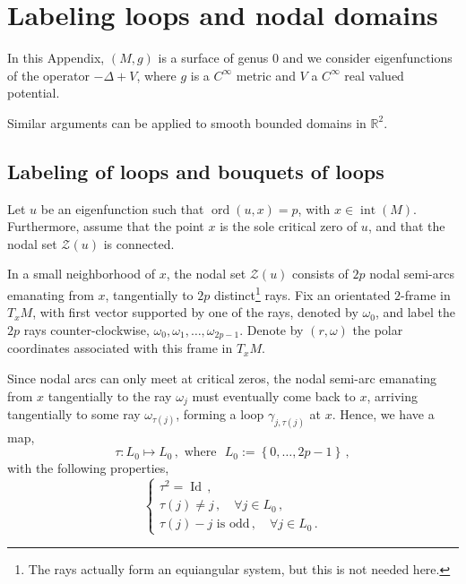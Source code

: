 \documentclass[12pt,a4paper]{amsart}
\theoremstyle{plain} %
\theoremstyle{definition}
\numberwithin{equation}{section}
\numberwithin{figure}{section}
\numberwithin{table}{section}
\newcommand{\R}{\mathbb{R}}
\newcommand{\cZ}{\mathcal{Z}}
\DeclareMathOperator{\inte}{int}
\DeclareMathOperator{\id}{Id}
\DeclareMathOperator{\ord}{ord}
\newcommand{\set}[1]{\left\lbrace #1 \right\rbrace}
\begin{document}
\section{Labeling loops and nodal domains}\label{S-llnd}

In this Appendix, $(M,g)$ is a surface of genus $0$ and we consider eigenfunctions of the operator $-\Delta + V$, where $g$ is a $C^{\infty}$ metric and $V$ a $C^{\infty}$ real valued potential.

 Similar arguments can be applied to smooth bounded domains in $\R^2$.


\subsection{Labeling of loops and bouquets of loops}\label{SS-llnd-w}

Let $u$ be an eigenfunction such that $\ord(u,x) =p$, with $x \in \inte(M)$. Furthermore, assume that the point $x$  is the sole critical zero of $u$, and that the nodal set $\cZ(u)$ is connected. \smallskip

In a small neighborhood of $x$, the nodal set $\cZ(u)$ consists of $2p$ nodal semi-arcs emanating from $x$, tangentially to $2p$ distinct\footnote{The rays actually form an equiangular system, but this is not needed here.} rays.  Fix an orientated $2$-frame in $T_xM$, with first vector supported by one of the rays, denoted by $\omega_0$, and label the $2p$ rays counter-clockwise, $\omega_0, \omega_1, \ldots, \omega_{2p-1}$. Denote by $(r,\omega)$ the polar coordinates associated with this frame in $T_xM$.\smallskip

Since nodal arcs can only meet at critical zeros, the nodal semi-arc emanating from $x$ tangentially to the ray $\omega_j$ must eventually come back to $x$, arriving tangentially to some ray $\omega_{\tau(j)}$, forming a loop $\gamma_{j,\tau(j)}$ at $x$. Hence, we have a map,
%
\begin{equation}\label{E-llnd-2}
\tau : L_0 \mapsto L_0\,, \text{~where~~} L_0:= \set{0,\ldots,2p-1}\,,
\end{equation}
%
with the following properties,
%
\begin{equation}\label{E-llnd-4}
\left\{
\begin{array}{l}
\tau^2 = \id\,,\\[5pt]
\tau(j) \not = j\,, \quad \forall j \in L_0\,,\\[5pt]
\tau(j) - j \text{~is odd}\,, \quad \forall j \in L_0\,.
\end{array}%
\right.
\end{equation}
\end{document}
